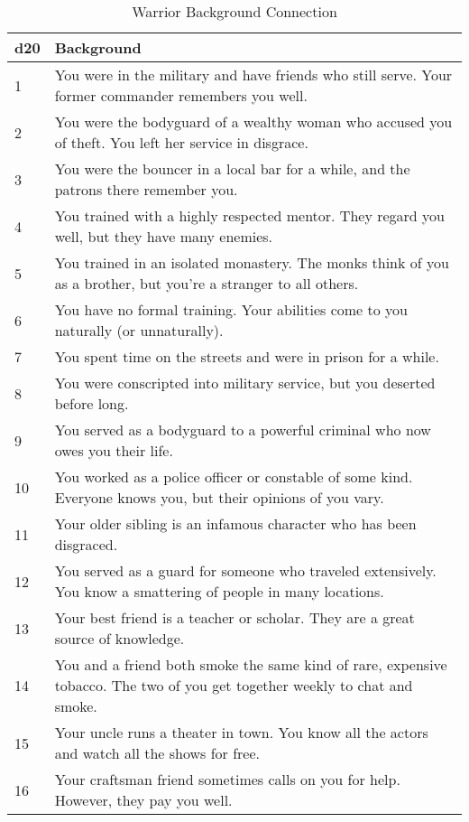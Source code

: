 \begin{multicols}{2}
\begin{table*}
\caption{Warrior Background Connection}
\label{tab:Warrior Background Connection}

\begin{tabularx}{\textwidth}{| p{} | p{} |}
\hline
\textbf{d20} & \textbf{Background} \\
\hline
1 & You were in the military and have friends who still serve. Your former commander remembers you well.\\ \hline
2 & You were the bodyguard of a wealthy woman who accused you of theft. You left her service in disgrace.  \\ \hline
3 & You were the bouncer in a local bar for a while, and the patrons there remember you.  \\ \hline
4 & You trained with a highly respected mentor. They regard you well, but they have many enemies.  \\ \hline
5 & You trained in an isolated monastery. The monks think of you as a brother, but you’re a stranger to all others.  \\ \hline
6 & You have no formal training. Your abilities come to you naturally (or unnaturally).  \\ \hline
7 & You spent time on the streets and were in prison for a while. \\ \hline
8 & You were conscripted into military service, but you deserted before long.  \\ \hline
9 & You served as a bodyguard to a powerful criminal who now owes you their life.  \\ \hline
10 & You worked as a police officer or constable of some kind. Everyone knows you, but their opinions of you vary.  \\ \hline
11 & Your older sibling is an infamous character who has been disgraced. \\ \hline
12 & You served as a guard for someone who traveled extensively. You know a smattering of people in many locations. \\ \hline
13 & Your best friend is a teacher or scholar. They are a great source of knowledge. \\ \hline
14 & You and a friend both smoke the same kind of rare, expensive tobacco. The two of you get together weekly to chat and smoke. \\ \hline
15 & Your uncle runs a theater in town. You know all the actors and watch all the shows for free. \\ \hline
16 & Your craftsman friend sometimes calls on you for help. However, they pay you well. \\ \hline

\end{tabularx}
\end{table*}
\end{multicols}
